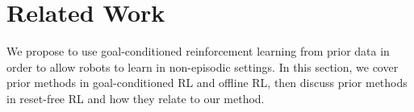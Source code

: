 \section{Related Work}


We propose to use goal-conditioned reinforcement learning from prior data in order to allow robots to learn in non-episodic settings.
In this section, we cover prior methods in goal-conditioned RL and offline RL, then discuss prior methods in reset-free RL and how they relate to our method.

